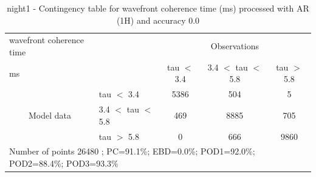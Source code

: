 \begin{table}[p!]
\begin{center}
\begin{tabular}{llccc}
\hline
{wavefront coherence time}                                       &                                                    & \multicolumn{3}{c}{Observations}                 \\
{ms}                                       &                             & tau $<$ 3.4   & 3.4 $<$ tau $<$ 5.8 & tau $>$ 5.8 \\
\hline
\multicolumn{1}{c}{\multirow{3}{*}{Model data}}  & tau $<$ 3.4             & 5386                & 504                       & 5              \\
                                                 & 3.4  $<$ tau $<$ 5.8 & 469                & 8885                       & 705              \\
                                                 & tau $>$ 5.8             & 0                & 666                       & 9860              \\
\hline
\multicolumn{5}{l}{ Number of points        26480 ; PC=91.1\%; EBD=0.0\%; POD1=92.0\%; POD2=88.4\%; POD3=93.3\%}
\end{tabular}
\end{center}
\caption{night1 - Contingency table for  wavefront coherence time (ms) processed with AR (1H) and accuracy 0.0}
\label{tab:contingencytauAFT:night1}
\end{table}
